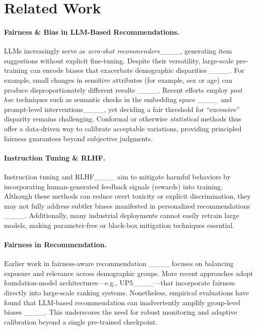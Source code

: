 \section{Related Work}
\label{sec:related_works}

\paragraph{Fairness \& Bias in LLM-Based Recommendations.}
LLMs increasingly serve as \emph{zero-shot recommenders}____, generating item suggestions without explicit fine-tuning. Despite their versatility, large-scale pre-training can encode biases that exacerbate demographic disparities ____. For example, small changes in sensitive attributes (for example, sex or age) can produce disproportionately different results ____. Recent efforts employ \emph{post hoc} techniques such as semantic checks in the embedding space ____ and prompt-level interventions____, yet deciding a fair threshold for “excessive” disparity remains challenging. Conformal or otherwise \emph{statistical} methods thus offer a data-driven way to calibrate acceptable variations, providing principled fairness guarantees beyond subjective judgments.

\vspace{-1em}
\paragraph{Instruction Tuning \& RLHF.}
Instruction tuning and RLHF____ aim to mitigate harmful behaviors by incorporating human-generated feedback signals (rewards) into training. Although these methods can reduce overt toxicity or explicit discrimination, they may not fully address subtler biases manifested in personalized recommendations ____. Additionally, many industrial deployments cannot easily retrain large models, making parameter-free or black-box mitigation techniques essential.

\vspace{-1em}
\paragraph{Fairness in Recommendation.}
Earlier work in fairness-aware recommendation ____ focuses on balancing exposure and relevance across demographic groups. More recent approaches adopt foundation-model architectures—e.g., UP5____—that incorporate fairness directly into large-scale ranking systems. Nonetheless, empirical evaluations have found that LLM-based recommendation can inadvertently amplify group-level biases ____. This underscores the need for robust monitoring and adaptive calibration beyond a single pre-trained checkpoint.

